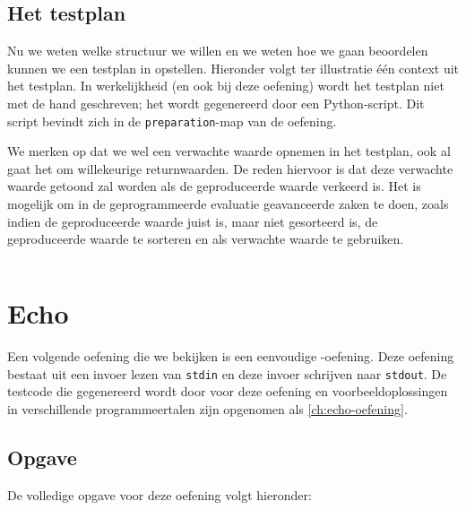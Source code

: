 \subsection{Het testplan}\label{subsec:oefening-lotto-testplan}

Nu we weten welke structuur we willen en we weten hoe we gaan beoordelen kunnen we een testplan in  opstellen.
Hieronder volgt ter illustratie één context uit het testplan.
In werkelijkheid (en ook bij deze oefening) wordt het testplan niet met de hand geschreven;
het wordt gegenereerd door een Python-script.
Dit script bevindt zich in de \texttt{preparation}-map van de oefening.

We merken op dat we wel een verwachte waarde opnemen in het testplan, ook al gaat het om willekeurige returnwaarden.
De reden hiervoor is dat deze verwachte waarde getoond zal worden als de geproduceerde waarde verkeerd is.
Het is mogelijk om in de geprogrammeerde evaluatie geavanceerde zaken te doen, zoals indien de geproduceerde waarde juist is, maar niet gesorteerd is, de geproduceerde waarde te sorteren en als verwachte waarde te gebruiken.

\inputminted[firstline=6,lastline=50,gobble=8]{json}{sources/lotto-plan.tson}

\section{Echo}\label{sec:oefening-echo}

Een volgende oefening die we bekijken is een eenvoudige -oefening.
Deze oefening bestaat uit een invoer lezen van \texttt{stdin} en deze invoer schrijven naar \texttt{stdout}.
De testcode die gegenereerd wordt door \tested{} voor deze oefening en voorbeeldoplossingen in verschillende programmeertalen zijn opgenomen als \cref{ch:echo-oefening}.

\subsection{Opgave}\label{subsec:oefening-echo-opgave}

De volledige opgave voor deze oefening volgt hieronder:

\begin{quote}
\end{quote}

